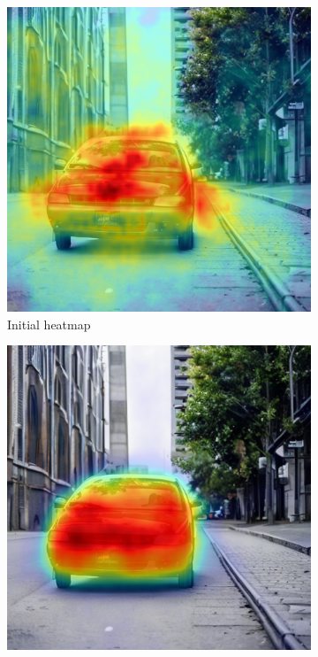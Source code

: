 \begin{figure}
\centering
  \begin{subfigure}{0.30\columnwidth}
   \includegraphics[width=\columnwidth]{img/3-methodology/initial_mask.png}
   \caption{Initial heatmap}
   \label{fig:optimization-initial-mask}
  \end{subfigure}
  \begin{subfigure}{0.30\columnwidth}
   \includegraphics[width=\columnwidth]{img/3-methodology/optimized_mask.png}

\end{subfigure}
\end{figure}
